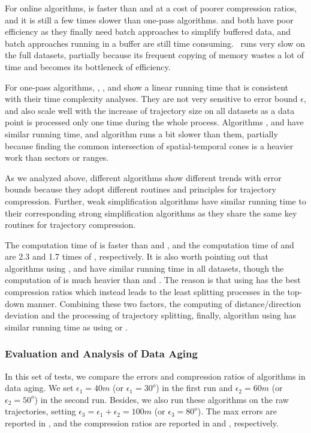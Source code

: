 {For online algorithms, \squishe is faster than \bqsa and \opwa at a cost of poorer compression ratios, and it is still a few times slower than one-pass algorithms. \bqsa and \opwa both have poor efficiency as they finally need batch approaches to simplify buffered data, and batch approaches running in a buffer are still time consuming. {\dagots~runs very slow on the full datasets, partially because its frequent copying of memory wastes a lot of time and becomes its bottleneck of efficiency.}

For one-pass algorithms, \operb, \siped, \cised and \interval show a linear running time that is consistent with their time complexity analyses. They are not very sensitive to error bound $\epsilon$, and also scale well with the increase of trajectory size on all datasets as a data point is processed only one time during the whole process.
Algorithms \siped, \operb and \interval have similar running time, and algorithm \cised runs a bit slower than them, partially because finding the common intersection of spatial-temporal cones is a heavier work than sectors or ranges.

{As we analyzed above, different algorithms show different trends with error bounds because they adopt different routines and principles for trajectory compression.}
{Further, weak simplification algorithms have similar running time to their corresponding strong simplification algorithms as they share the same key routines for trajectory compression.}



The computation time of \dad is faster than \ped and \sed, and the computation time of \ped and \sed are 2.3 and 1.7 times of \dad, respectively.
{It is also worth pointing out that algorithms \dpa using \ped, \sed and \dad have similar running time in all datasets, though the computation of \ped is much heavier than \sed and \dad. The reason is that \dpa using \ped has the best compression ratios which instead leads to the least splitting processes in the top-down manner. Combining these two factors, \ie the computing of distance/direction deviation and the processing of trajectory splitting, finally, algorithm \dpa using \ped has similar running time as \dpa using \dad or \sed.}

\subsubsection{{Evaluation and {Analysis} of Data Aging}}
\label{sec:exp-data-aging}
In this set of tests, we compare the errors and compression ratios of algorithms in data aging. We set $\epsilon_1=40m$ (or $\epsilon_1=30^o$) in the first run and $\epsilon_2=60m$ (or $\epsilon_2=50^o$) in the second run. Besides, we also run these algorithms on the raw trajectories, setting $\epsilon_3=\epsilon_1 + \epsilon_2=100m$ (or $\epsilon_3=80^o$). The max errors are reported in , and the compression ratios are reported in  and , respectively.




}
